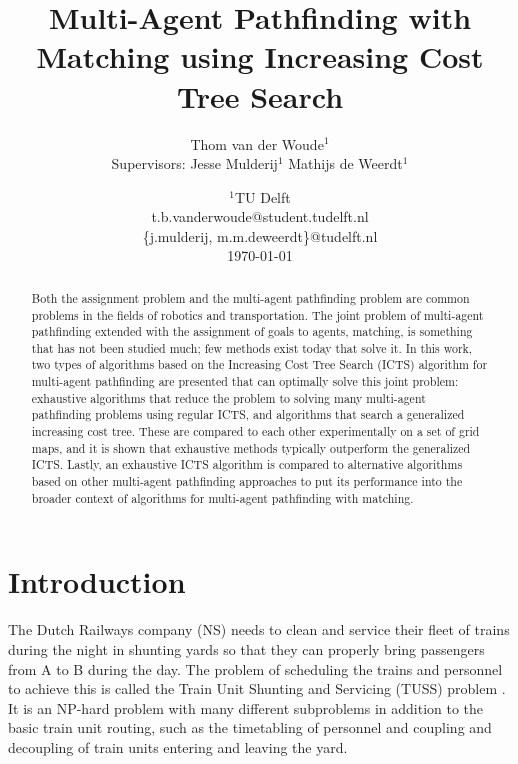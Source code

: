 \documentclass[english]{article}
\begin{document}
	
	\title{Multi-Agent Pathfinding with Matching using Increasing Cost Tree Search}
	\author{
		Thom van der Woude$^1$\\[2ex]
		Supervisors: Jesse Mulderij$^1$ Mathijs de Weerdt$^1$
	}
	\date{%
		$^1$TU Delft\\
		t.b.vanderwoude@student.tudelft.nl\\\{j.mulderij, m.m.deweerdt\}@tudelft.nl\\[2ex]
		\today
	}
	
	\maketitle
	
	\begin{abstract}
		\noindent Both the assignment problem and the multi-agent pathfinding problem are common problems in the fields of robotics and transportation. The joint problem of multi-agent pathfinding extended with the assignment of goals to agents, matching, is something that has not been studied much; few methods exist today that solve it. In this work, two types of algorithms based on the Increasing Cost Tree Search (ICTS) algorithm for multi-agent pathfinding are presented that can optimally solve this joint problem: exhaustive algorithms that reduce the problem to solving many multi-agent pathfinding problems using regular ICTS, and algorithms that search a generalized increasing cost tree. These are compared to each other experimentally on a set of grid maps, and it is shown that exhaustive methods typically outperform the generalized ICTS. Lastly, an exhaustive ICTS algorithm is compared to alternative algorithms based on other multi-agent pathfinding approaches to put its performance into the broader context of algorithms for multi-agent pathfinding with matching.
	\end{abstract}
	
	\section{Introduction}
	The Dutch Railways company (NS) needs to clean and service their fleet of trains during the night in shunting yards so that they can properly bring passengers from A to B during the day. 
	The problem of scheduling the trains and personnel to achieve this is called the Train Unit Shunting and Servicing (TUSS) problem \cite{mulderij2020}. 
	It is an NP-hard problem with many different subproblems in addition to the basic train unit routing, such as the timetabling of personnel and coupling and decoupling of train units entering and leaving the yard. %
	
\end{document}
